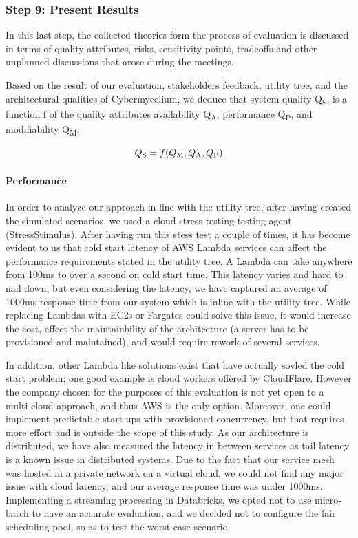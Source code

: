 \documentclass{bmcart}
\begin{document}
\subsubsection{Step 9: Present Results} \label{evaluation-results}

In this last step, the collected theories form the process of evaluation is discussed in terms of quality attributes, risks, sensitivity points, tradeoffs and other unplanned discussions that arose during the meetings. 

Based on the result of our evaluation, stakeholders feedback, utility tree, and the architectural qualities of Cybermycelium, we deduce that system quality Q\textsubscript{S}, is a function f of the quality attributes availability Q\textsubscript{A}, performance Q\textsubscript{P}, and modifiability Q\textsubscript{M}.

\begin{equation}
    Q\textsubscript{S} = f(Q\textsubscript{M}, Q\textsubscript{A}, Q\textsubscript{P})
\end{equation}

\paragraph{Performance} In order to analyze our approach in-line with the utility tree, after having created the simulated scenarios, we used a cloud stress testing testing agent (StressStimulus). After having run this stess test a couple of times, it has become evident to us that cold start latency of AWS Lambda services can affect the performance requirements stated in the utility tree. A Lambda can take anywhere from 100ms to over a second on cold start time. This latency varies and hard to nail down, but even considering the latency, we have captured an average of 1000ms response time from our system which is inline with the utility tree. While replacing Lambdas with EC2s or Fargates could solve this issue, it would increase the cost, affect the maintainbility of the architecture (a server has to be provisioned and maintained), and would require rework of several services.

In addition, other Lambda like solutions exist that have actually sovled the cold start problem; one good example is cloud workers offered by CloudFlare. However the company chosen for the purposes of this evaluation is not yet open to a multi-cloud approach, and thus AWS is the only option. Moreover, one could implement predictable start-ups with provisioned concurrency, but that requires more effort and is outside the scope of this study. As our architecture is distributed, we have also measured the latency in between services as tail latency is a known issue in distributed systems. Due to the fact that our service mesh was hosted in a private network on a virtual cloud, we could not find any major issue with cloud latency, and our average response time was under 1000ms. Implementing a streaming processing in Databricks, we opted not to use micro-batch to have an accurate evaluation, and we decided not to configure the fair scheduling pool, so as to test the worst case scenario.
\end{document}
